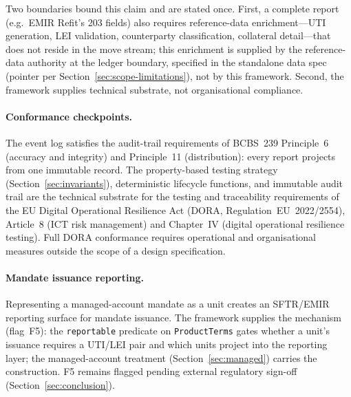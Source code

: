 Two boundaries bound this claim and are stated once. First, a complete report (e.g.\ EMIR Refit's 203 fields) also requires reference-data enrichment---UTI generation, LEI validation, counterparty classification, collateral detail---that does not reside in the move stream; this enrichment is supplied by the reference-data authority at the ledger boundary, specified in the standalone data spec (pointer per Section~\ref{sec:scope-limitations}), not by this framework. Second, the framework supplies technical substrate, not organisational compliance.

\paragraph{Conformance checkpoints.}
The event log satisfies the audit-trail requirements of BCBS~239 Principle~6 (accuracy and integrity) and Principle~11 (distribution): every report projects from one immutable record. The property-based testing strategy (Section~\ref{sec:invariants}), deterministic lifecycle functions, and immutable audit trail are the technical substrate for the testing and traceability requirements of the EU Digital Operational Resilience Act (DORA, Regulation~EU~2022/2554), Article~8 (ICT risk management) and Chapter~IV (digital operational resilience testing). Full DORA conformance requires operational and organisational measures outside the scope of a design specification.

\paragraph{Mandate issuance reporting.}
Representing a managed-account mandate as a unit creates an SFTR/EMIR reporting surface for mandate issuance. The framework supplies the mechanism (flag~F5): the \texttt{reportable} predicate on \texttt{ProductTerms} gates whether a unit's issuance requires a UTI/LEI pair and which units project into the reporting layer; the managed-account treatment (Section~\ref{sec:managed}) carries the construction. F5 remains flagged pending external regulatory sign-off (Section~\ref{sec:conclusion}).

\clearpage
